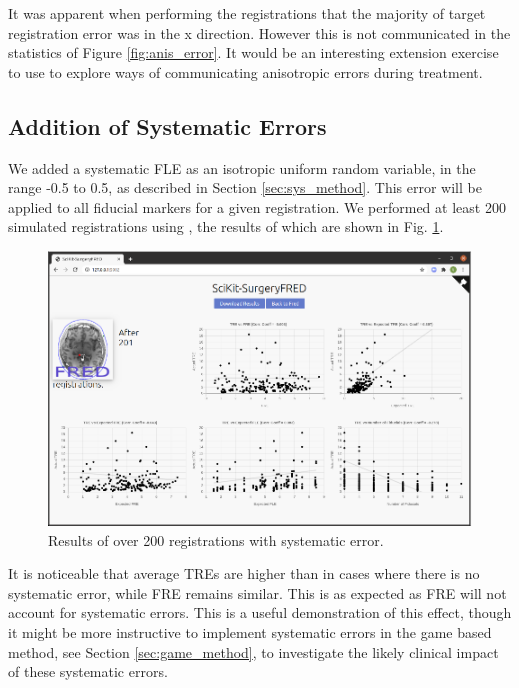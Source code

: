 It was apparent when performing the registrations that the majority of target 
registration error was in the x direction. However this is not communicated in the 
statistics of Figure \ref{fig:anis_error}. It would be an interesting extension 
exercise to use \fred to explore ways of communicating anisotropic errors during 
treatment.

\subsection{Addition of Systematic Errors}
We added a systematic \gls{FLE} as an isotropic uniform random variable, in the range
-0.5 to 0.5, as described in Section \ref{sec:sys_method}. This error will be applied to all fiducial markers for a 
given registration. We performed at least 200 simulated registrations using \fredns, the results of which are shown in Fig. \ref{fig:sys_error}.
\begin{figure}
	\begin{center}
			\includegraphics[width=0.9\linewidth]{images/systematic_error.eps}
			\caption{\label{fig:sys_error}Results of over 200 registrations with systematic error.}
	\end{center}
\end{figure}

It is noticeable that average \gls{TRE}s are higher than in cases where there is no
systematic error, while \gls{FRE} remains similar. This is as expected as \gls{FRE} will 
not account for systematic errors. This is a useful demonstration of this effect, though 
it might be more instructive to implement systematic errors in the game based method, see
Section \ref{sec:game_method}, to investigate the likely clinical impact of these
systematic errors.

